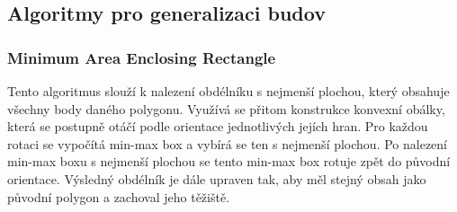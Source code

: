 \subsection{Algoritmy pro generalizaci budov}

\subsubsection{Minimum Area Enclosing Rectangle}
Tento algoritmus slouží k nalezení obdélníku s nejmenší plochou, který obsahuje všechny body daného polygonu. Využívá se přitom konstrukce konvexní obálky, která se postupně otáčí podle orientace jednotlivých jejích hran. Pro každou rotaci se vypočítá min-max box a vybírá se ten s nejmenší plochou. Po nalezení min-max boxu s nejmenší plochou se tento min-max box rotuje zpět do původní orientace. Výsledný obdélník je dále upraven tak, aby měl stejný obsah jako původní polygon a zachoval jeho těžiště\cite{Bayer2008}.\\

